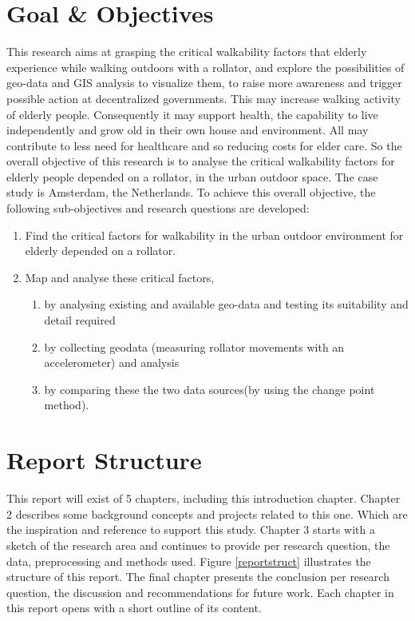 \section{Goal \& Objectives}
This research aims at grasping the critical walkability factors that elderly experience while walking outdoors with a rollator, and explore the possibilities of geo-data and GIS analysis to visualize them, to raise more awareness and trigger possible action at decentralized governments. This may increase walking activity of elderly people. Consequently it may support health, the capability to live independently and grow old in their own house and environment. All may contribute to less need for healthcare and so reducing costs for elder care.
So the overall objective of this research is to analyse the critical walkability factors for elderly people depended on a rollator, in the urban outdoor space. The case study is Amsterdam, the Netherlands. To achieve this overall objective, the following sub-objectives and research questions are developed:

\begin{enumerate}
\item Find the critical factors for walkability in the urban outdoor environment for elderly depended on a rollator.
\item Map and analyse these critical factors, 
 \begin{enumerate}
 	\item by analysing existing and available geo-data and testing its suitability and detail required
 	\item by collecting geodata (measuring rollator movements with an accelerometer) and analysis
 	\item by comparing these the two data sources(by using the change point method).
 \end{enumerate}
\end{enumerate}


\section{Report Structure}
This report will exist of 5 chapters, including this introduction chapter. Chapter 2 describes some background concepts and projects related to this one. Which are the inspiration and reference to support this study. Chapter 3 starts with a sketch of the research area and continues to provide per research question, the data, preprocessing and methods used. Figure \ref{reportstruct} illustrates the structure of this report. The final chapter presents the conclusion per research question, the discussion and recommendations for future work. Each chapter in this report opens with a short outline of its content.


